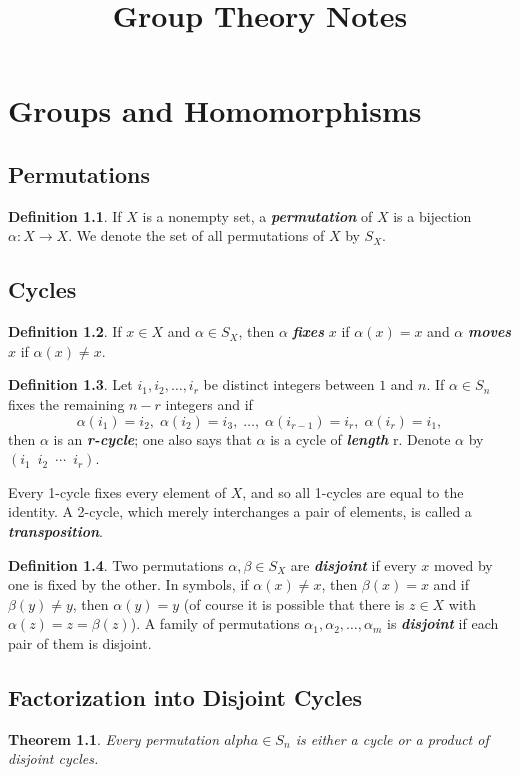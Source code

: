 \documentclass[10pt]{report}
\title{Group Theory Notes}
\newtheorem{theorem}{Theorem}[chapter]
\theoremstyle{definition}
\newtheorem*{definition}{Definition}
\newcommand{\term}[1]{\textbf{\textit{#1}}}
\begin{document}
\chapter{Groups and Homomorphisms}
\section{Permutations}
\begin{definition}
	If $X$ is a nonempty set, a \term{permutation} of $X$ is a bijection $\alpha:X\to X$. We denote the set of all permutations of $X$ by $S_X$.
\end{definition}

\section{Cycles}
\begin{definition}
	If $x\in X$ and $\alpha\in S_X$, then $\alpha$ \term{fixes} $x$ if $\alpha(x)=x$ and $\alpha$ \term{moves} $x$ if $\alpha(x)\neq x$.
\end{definition}

\begin{definition}
	Let $i_1, i_2, \dots, i_r$ be distinct integers between $1$ and $n$. If $\alpha\in S_n$ fixes the remaining $n-r$ integers and if
	\[ \alpha(i_1)=i_2,\;\alpha(i_2)=i_3,\;\dots,\;\alpha(i_{r-1})=i_r,\;\alpha(i_r)=i_1, \]
	then $\alpha$ is an \term{r-cycle}; one also says that $\alpha$ is a cycle of \term{length} r. Denote $\alpha$ by $(i_1\enspace i_2\enspace \cdots \enspace i_r)$.
	\smallskip

	Every 1-cycle fixes every element of $X$, and so all 1-cycles are equal to the identity. A 2-cycle, which merely interchanges a pair of elements, is called a \term{transposition}.
\end{definition}

\begin{definition}
	Two permutations $\alpha, \beta\in S_X$ are \term{disjoint} if every $x$ moved by one is fixed by the other.
	In symbols, if $\alpha(x)\neq x$, then $\beta(x)=x$ and if $\beta(y)\neq y$, then $\alpha(y)=y$
	(of course it is possible that there is $z\in X$ with $\alpha(z)=z=\beta(z)$).
	A family of permutations $\alpha_1,\alpha_2,\dots,\alpha_m$ is \term{disjoint} if each pair of them is disjoint.
\end{definition}

\section{Factorization into Disjoint Cycles}
\begin{theorem}
	Every permutation $alpha\in S_n$ is either a cycle or a product of disjoint cycles.
\end{theorem}
\end{document}
